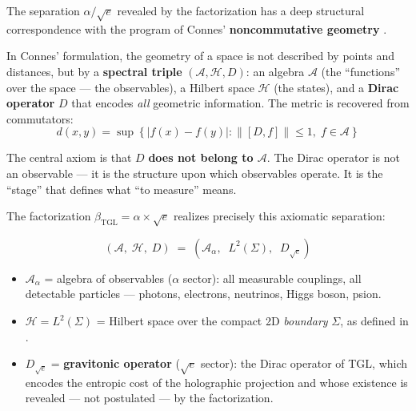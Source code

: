 \documentclass[12pt,a4paper,twoside]{article}
\newcommand{\betatgl}{\beta_{\!\scriptscriptstyle\mathrm{TGL}}}
\newcommand{\boundary}{\textit{boundary}}
\begin{document}
The separation $\alpha / \sqrt{e}$ revealed by the factorization has a deep structural correspondence with the program of Connes' \textbf{noncommutative geometry} \cite{Connes1994, Connes1996}.

In Connes' formulation, the geometry of a space is not described by points and distances, but by a \textbf{spectral triple} $(\mathcal{A}, \mathcal{H}, D)$: an algebra $\mathcal{A}$ (the ``functions'' over the space --- the observables), a Hilbert space $\mathcal{H}$ (the states), and a \textbf{Dirac operator} $D$ that encodes \textit{all} geometric information. The metric is recovered from commutators:
\begin{equation}
d(x,y) = \sup\left\{|f(x) - f(y)| : \|[D, f]\| \leq 1,\; f \in \mathcal{A}\right\}
\label{eq:connes_distance}
\end{equation}

The central axiom is that $D$ \textbf{does not belong to $\mathcal{A}$}. The Dirac operator is not an observable --- it is the structure upon which observables operate. It is the ``stage'' that defines what ``to measure'' means.

The factorization $\betatgl = \alpha \times \sqrt{e}$ realizes precisely this axiomatic separation:

\begin{factorbox}[title={Spectral Triple of TGL}]
\begin{equation}
(\mathcal{A},\; \mathcal{H},\; D) \;=\; \left(\mathcal{A}_\alpha,\;\; L^2(\Sigma),\;\; D_{\sqrt{e}}\right)
\label{eq:tripla}
\end{equation}

\begin{itemize}[nosep]
\item $\mathcal{A}_\alpha$ = algebra of observables ($\alpha$ sector): all measurable couplings, all detectable particles --- photons, electrons, neutrinos, Higgs boson, psion.

\item $\mathcal{H} = L^2(\Sigma)$ = Hilbert space over the compact 2D \boundary{} $\Sigma$, as defined in \cite{Miguel2026Graviton}.

\item $D_{\sqrt{e}}$ = \textbf{gravitonic operator} ($\sqrt{e}$ sector): the Dirac operator of TGL, which encodes the entropic cost of the holographic projection and whose existence is revealed --- not postulated --- by the factorization.
\end{itemize}
\end{factorbox}
\end{document}
